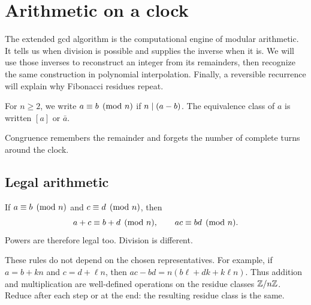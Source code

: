 \chapter{Arithmetic on a clock}
\label{chap:modular}

\begin{bigidea}
The extended gcd algorithm is the computational engine of modular arithmetic.
It tells us when division is possible and supplies the inverse when it is.
We will use those inverses to reconstruct an integer from its remainders,
then recognize the same construction in polynomial interpolation.
Finally, a reversible recurrence will explain why Fibonacci residues repeat.
\end{bigidea}

\begin{definition}
For $n\ge2$, we write $a\equiv b\pmod n$ if $n\mid(a-b)$. The equivalence class of $a$ is written $[a]$ or $\bar a$.
\end{definition}

Congruence remembers the remainder and forgets the number of complete turns around the clock.

\begin{center}
\end{center}

\section{Legal arithmetic}

If $a\equiv b\pmod n$ and $c\equiv d\pmod n$, then
\[
a+c\equiv b+d\pmod n,\qquad ac\equiv bd\pmod n.
\]
Powers are therefore legal too. Division is different.

These rules do not depend on the chosen representatives. For example, if
$a=b+kn$ and $c=d+\ell n$, then
$ac-bd=n(b\ell+dk+k\ell n)$. Thus addition and multiplication are
well-defined operations on the residue classes $\mathbb Z/n\mathbb Z$. Reduce after
each step or at the end: the resulting residue class is the same.

